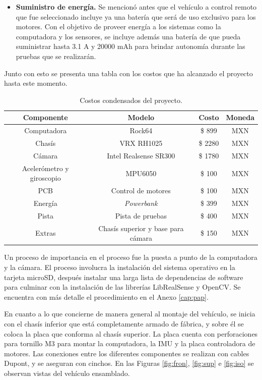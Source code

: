 \begin{itemize}
	\item {\bf Suministro de energía.} Se mencionó antes que el vehículo a control remoto que fue seleccionado incluye ya una batería que será de uso exclusivo para los motores. Con el objetivo de proveer energía a los sistemas como la computadora y los sensores, se incluye además una batería de que pueda suministrar hasta 3.1 A y 20000 mAh para brindar autonomía durante las pruebas que se realizarán.
\end{itemize}
\par Junto con esto se presenta una tabla con los costos que ha alcanzado el proyecto hasta este momento.
\begin{table}[htbp!]
	\caption{Costos condensados del proyecto.}
	\label{tab:costos}
	\begin{center}
		\begin{tabular}{|c|c|c|c|}
			\hline
			{\bf Componente} & {\bf Modelo} & {\bf Costo} & {\bf Moneda}\\
			\hline
			\hline
			Computadora & Rock64 & \$ 899 & MXN\\
			\hline
			Chasís & VRX RH1025 & \$ 2280 & MXN\\
			\hline
			Cámara & Intel Realsense SR300 & \$ 1780 & MXN\\
			\hline
			Acelerómetro y giroscopio & MPU6050 & \$ 100 & MXN\\
			\hline
			PCB & Control de motores & \$ 100 & MXN\\
			\hline
			Energía & {\it Powerbank} & \$ 399 & MXN\\
			\hline
			Pista & Pista de pruebas & \$ 400 & MXN\\
			\hline
			Extras & Chasís superior y base para cámara & \$ 150 & MXN\\
			\hline
		\end{tabular}
	\end{center}
\end{table}
\par Un proceso de importancia en el proceso fue la puesta a punto de la computadora y la cámara. El proceso involucra la instalación del sistema operativo en la tarjeta microSD, después instalar una larga lista de dependencias de software para culminar con la instalación de las librerías LibRealSense y OpenCV. Se encuentra con más detalle el procedimiento en el Anexo \ref{cap:pap}.
\par En cuanto a lo que concierne de manera general al montaje del vehículo, se inicia con el chasís inferior que está completamente armado de fábrica, y sobre él se coloca la placa que conforma al chasís superior. La placa cuenta con perforaciones para tornillo M3 para montar la computadora, la IMU y la placa controladora de motores. Las conexiones entre los diferentes componentes se realizan con cables Dupont, y se aseguran con cinchos. En las Figuras \ref{fig:fron}, \ref{fig:sup} e \ref{fig:iso} se observan vistas del vehículo ensamblado.
